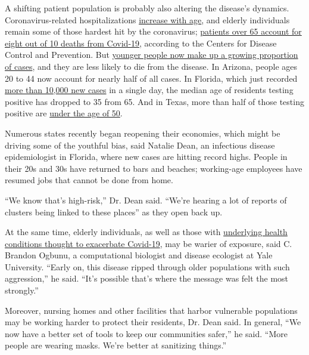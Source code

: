 A shifting patient population is probably also altering the disease's
dynamics. Coronavirus-related hospitalizations
\href{https://www.cdc.gov/coronavirus/2019-ncov/covid-data/covidview/index.html}{increase
with age}, and elderly individuals remain some of those hardest hit by
the coronavirus;
\href{https://www.cdc.gov/coronavirus/2019-ncov/need-extra-precautions/older-adults.html}{patients
over 65 account for eight out of 10 deaths from Covid-19}, according to
the Centers for Disease Control and Prevention. But
\href{https://www.nytimes3xbfgragh.onion/2020/06/25/us/coronavirus-cases-young-people.html}{younger
people now make up a growing proportion of cases}, and they are less
likely to die from the disease. In Arizona, people ages 20 to 44 now
account for nearly half of all cases. In Florida, which just recorded
\href{https://www.reuters.com/article/us-health-coronavirus-usa-florida/florida-shatters-records-with-over-10000-new-covid-19-cases-in-single-day-idUSKBN243299}{more
than 10,000 new cases} in a single day, the median age of residents
testing positive has dropped to 35 from 65. And in Texas, more than half
of those testing positive are
\href{https://txdshs.maps.arcgis.com/apps/opsdashboard/index.html\#/ed483ecd702b4298ab01e8b9cafc8b83}{under
the age of 50}.

Numerous states recently began reopening their economies, which might be
driving some of the youthful bias, said Natalie Dean, an infectious
disease epidemiologist in Florida, where new cases are hitting record
highs. People in their 20s and 30s have returned to bars and beaches;
working-age employees have resumed jobs that cannot be done from home.

``We know that's high-risk,'' Dr. Dean said. ``We're hearing a lot of
reports of clusters being linked to these places'' as they open back up.

At the same time, elderly individuals, as well as those with
\href{https://www.nytimes3xbfgragh.onion/2020/06/15/health/coronavirus-underlying-conditions.html}{underlying
health conditions thought to exacerbate Covid-19}, may be warier of
exposure, said C. Brandon Ogbunu, a computational biologist and disease
ecologist at Yale University. ``Early on, this disease ripped through
older populations with such aggression,'' he said. ``It's possible
that's where the message was felt the most strongly.''

Moreover, nursing homes and other facilities that harbor vulnerable
populations may be working harder to protect their residents, Dr. Dean
said. In general, ``We now have a better set of tools to keep our
communities safer,'' he said. ``More people are wearing masks. We're
better at sanitizing things.''

